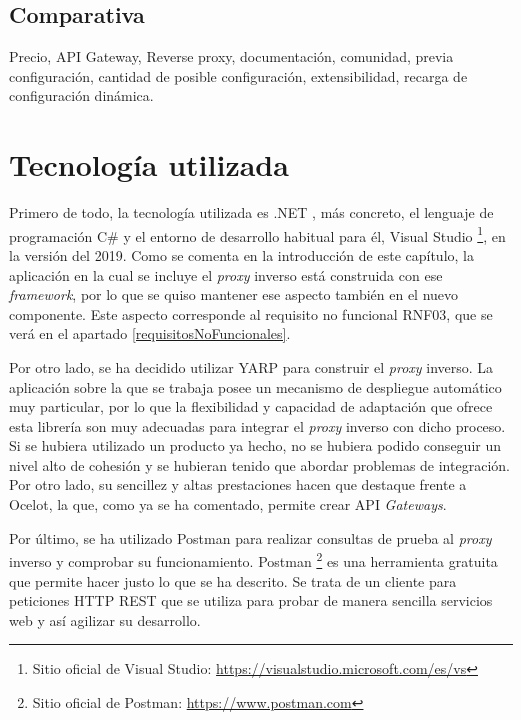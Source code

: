 \documentclass[11pt,spanish,listoffigures]{tfgetsinf}
\begin{document}

	\section{Comparativa}

Precio, API Gateway, Reverse proxy, documentación, comunidad, previa configuración, cantidad de posible configuración, extensibilidad, recarga de configuración dinámica.


\chapter{Tecnología utilizada}

Primero de todo, la tecnología utilizada es .NET \cite{DotNet}, más concreto, el lenguaje de programación C\# \cite{Csharp} y el entorno de desarrollo habitual para él, Visual Studio \footnote{Sitio oficial de Visual Studio: \url{https://visualstudio.microsoft.com/es/vs}}, en la versión del 2019. Como se comenta en la introducción de este capítulo, la aplicación en la cual se incluye el \emph{proxy} inverso está construida con ese \emph{framework}, por lo que se quiso mantener ese aspecto también en el nuevo componente. Este aspecto corresponde al requisito no funcional RNF03, que se verá en el apartado \ref{requisitosNoFuncionales}.

Por otro lado, se ha decidido utilizar YARP para construir el \emph{proxy} inverso. La aplicación sobre la que se trabaja posee un mecanismo de despliegue automático muy 
particular, por lo que la flexibilidad y capacidad de adaptación que ofrece esta librería son muy adecuadas para integrar el \emph{proxy} inverso con dicho proceso. Si se hubiera utilizado un producto ya hecho, no se hubiera podido conseguir un nivel alto de cohesión y se hubieran tenido que abordar problemas de integración. Por otro lado, su sencillez y altas prestaciones hacen que destaque frente a Ocelot, la que, como ya se ha comentado, permite crear API \emph{Gateways}.

Por último, se ha utilizado Postman para realizar consultas de prueba al \emph{proxy} inverso y comprobar su funcionamiento. Postman \footnote{Sitio oficial de Postman: \url{https://www.postman.com}} es una herramienta gratuita que permite hacer justo lo que se ha descrito. Se trata de un cliente para peticiones HTTP REST que se utiliza para probar de manera sencilla servicios web y así agilizar su desarrollo.
\end{document}
